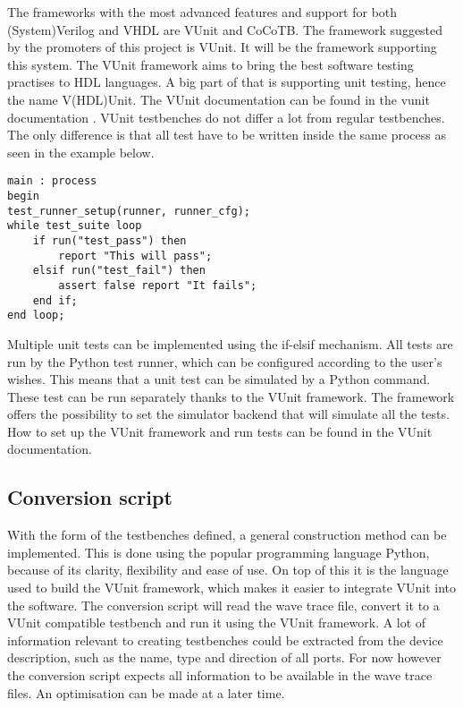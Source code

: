 The frameworks with the most advanced features and support for both (System)Verilog and VHDL are VUnit and CoCoTB. The framework suggested by the promoters of this project is VUnit. It will be the framework supporting this system.
\npar
The VUnit framework aims to bring the best software testing practises to HDL languages. A big part of that is supporting unit testing, hence the name V(HDL)Unit. The VUnit documentation can be found in the vunit documentation \cite{vunit_doc}. VUnit testbenches do not differ a lot from regular testbenches. The only difference is that all test have to be written inside the same process as seen in the example below.
\begin{lstlisting}[style=vhdl, caption={Main test loop for a VUnit testbench}]
main : process
begin
test_runner_setup(runner, runner_cfg);
while test_suite loop
	if run("test_pass") then
		report "This will pass";
	elsif run("test_fail") then
		assert false report "It fails";
	end if;
end loop;
\end{lstlisting}\noindent
Multiple unit tests can be implemented using the if-elsif mechanism. All tests are run by the Python test runner, which can be configured according to the user's wishes. This means that a unit test can be simulated by a Python command. These test can be run separately thanks to the VUnit framework. The framework offers the possibility to set the simulator backend that will simulate all the tests. How to set up the VUnit framework and run tests can be found in the VUnit documentation.
\subsection{Conversion script}
With the form of the testbenches defined, a general construction method can be implemented. This is done using the popular programming language Python, because of its clarity, flexibility and ease of use. On top of this it is the language used to build the VUnit framework, which makes it easier to integrate VUnit into the software.
\npar
The conversion script will read the wave trace file, convert it to a VUnit compatible testbench and run it using the VUnit framework.
\npar
A lot of information relevant to creating testbenches could be extracted from the device description, such as the name, type and direction of all ports. For now however the conversion script expects all information to be available in the wave trace files. An optimisation can be made at a later time.
